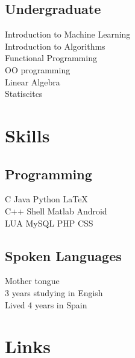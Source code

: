 \documentclass[letterpaper]{deedy-resume} %
\begin{document}
\begin{minipage}[t]{0.33\textwidth}
\subsection{Undergraduate}

Introduction to Machine Learning\\
Introduction to Algorithms\\
Functional Programming \\
OO programming\\
Linear Algebra\\
Statiscitcs \\

\sectionspace %


\section{Skills}
\subsection{Programming}

C  \textbullet{} Java \textbullet{} Python \textbullet{} \LaTeX\ \\ 
C++ \textbullet{} Shell \textbullet{} Matlab \textbullet{} Android\\
LUA \textbullet{} MySQL \textbullet{} PHP \textbullet{} CSS



\sectionspace %

\subsection{Spoken Languages}

Mother tongue\\
3 years studying in Engish\\
Lived 4 years in Spain

\sectionspace %


\section{Links} 


\end{minipage}
\end{document}
